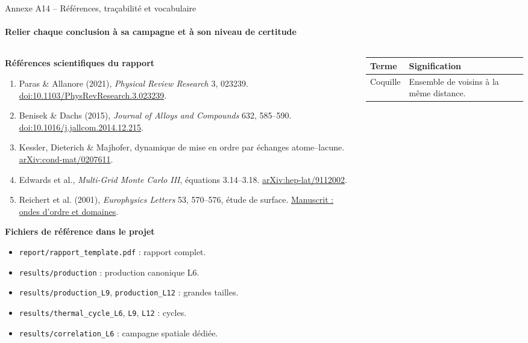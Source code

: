\documentclass[aspectratio=169,10pt]{beamer}
\newcommand{\tightlist}{\setlength{\itemsep}{2pt}\setlength{\parskip}{0pt}}
\begin{document}
\begin{frame}[t]{Annexe A14 -- Références, traçabilité et vocabulaire}
\framesubtitle{Relier chaque conclusion à sa campagne et à son niveau de certitude}
\begin{columns}[T,onlytextwidth]
\begin{column}{.52\textwidth}
\textbf{Références scientifiques du rapport}
\begin{enumerate}\tightlist
\item Paras \& Allanore (2021), \emph{Physical Review Research} 3, 023239.
\href{https://doi.org/10.1103/PhysRevResearch.3.023239}{doi:10.1103/PhysRevResearch.3.023239}.
\item Benisek \& Dachs (2015), \emph{Journal of Alloys and Compounds} 632, 585--590.
\href{https://doi.org/10.1016/j.jallcom.2014.12.215}{doi:10.1016/j.jallcom.2014.12.215}.
\item Kessler, Dieterich \& Majhofer, dynamique de mise en ordre par échanges atome--lacune.
\href{https://arxiv.org/abs/cond-mat/0207611}{arXiv:cond-mat/0207611}.
\item Edwards et al., \emph{Multi-Grid Monte Carlo III}, équations 3.14--3.18.
\href{https://arxiv.org/abs/hep-lat/9112002}{arXiv:hep-lat/9112002}.
\item Reichert et al. (2001), \emph{Europhysics Letters} 53, 570--576, étude de surface.
\href{https://www.homepages.ucl.ac.uk/~ucapikr/harald3.pdf}{Manuscrit : ondes d'ordre et domaines}.
\end{enumerate}
\textbf{Fichiers de référence dans le projet}
\begin{itemize}\tightlist
\item \texttt{report/rapport\_template.pdf} : rapport complet.
\item \texttt{results/production} : production canonique L6.
\item \texttt{results/production\_L9}, \texttt{production\_L12} : grandes tailles.
\item \texttt{results/thermal\_cycle\_L6}, \texttt{L9}, \texttt{L12} : cycles.
\item \texttt{results/correlation\_L6} : campagne spatiale dédiée.
\end{itemize}
\end{column}
\begin{column}{.45\textwidth}
\begin{tabular}{p{.25\linewidth}p{.66\linewidth}}\toprule
Terme & Signification\\\midrule
Coquille & Ensemble de voisins à la même distance.\\[2pt]

\end{tabular}
\end{column}
\end{columns}
\end{frame}
\end{document}
